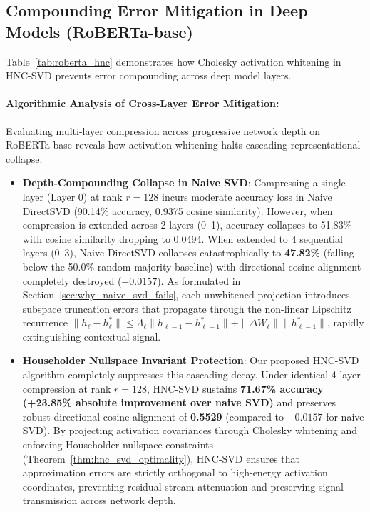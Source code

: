 \documentclass{article}
\begin{document}
\subsection{Compounding Error Mitigation in Deep Models (RoBERTa-base)}
Table~\ref{tab:roberta_hnc} demonstrates how Cholesky activation whitening in HNC-SVD prevents error compounding across deep model layers.



\paragraph{Algorithmic Analysis of Cross-Layer Error Mitigation:}
Evaluating multi-layer compression across progressive network depth on RoBERTa-base reveals how activation whitening halts cascading representational collapse:
\begin{itemize}
    \item \textbf{Depth-Compounding Collapse in Naive SVD}: Compressing a single layer (Layer 0) at rank $r=128$ incurs moderate accuracy loss in Naive DirectSVD (90.14\% accuracy, 0.9375 cosine similarity). However, when compression is extended across 2 layers (0--1), accuracy collapses to 51.83\% with cosine similarity dropping to 0.0494. When extended to 4 sequential layers (0--3), Naive DirectSVD collapses catastrophically to \textbf{47.82\%} (falling below the 50.0\% random majority baseline) with directional cosine alignment completely destroyed ($-0.0157$). As formulated in Section~\ref{sec:why_naive_svd_fails}, each unwhitened projection introduces subspace truncation errors that propagate through the non-linear Lipschitz recurrence $\|h_\ell - h_\ell^*\| \le \Lambda_\ell \|h_{\ell-1} - h_{\ell-1}^*\| + \|\Delta W_\ell\| \|h_{\ell-1}^*\|$, rapidly extinguishing contextual signal.
    \item \textbf{Householder Nullspace Invariant Protection}: Our proposed HNC-SVD algorithm completely suppresses this cascading decay. Under identical 4-layer compression at rank $r=128$, HNC-SVD sustains \textbf{71.67\% accuracy (+23.85\% absolute improvement over naive SVD)} and preserves robust directional cosine alignment of \textbf{0.5529} (compared to $-0.0157$ for naive SVD). By projecting activation covariances through Cholesky whitening and enforcing Householder nullspace constraints (Theorem~\ref{thm:hnc_svd_optimality}), HNC-SVD ensures that approximation errors are strictly orthogonal to high-energy activation coordinates, preventing residual stream attenuation and preserving signal transmission across network depth.
\end{itemize}
\end{document}
